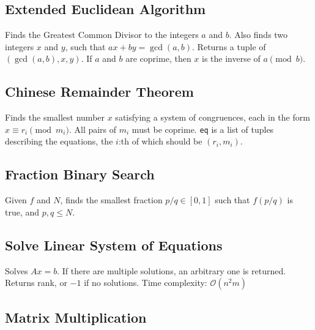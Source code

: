 \documentclass{article}
\begin{document}
\subsection*{Extended Euclidean Algorithm}
Finds the Greatest Common Divisor to the integers $a$ and $b$. Also finds two integers $x$ and $y$, such that $ax+by=\gcd(a,b)$.
Returns a tuple of $(\gcd(a, b), x, y)$. If $a$ and $b$ are coprime, then $x$ is the inverse of $a \pmod{b}$.
\begin{multicols}{2}
  
  \columnbreak
  
\end{multicols}

\subsection*{Chinese Remainder Theorem}
Finds the smallest number $x$ satisfying a system of congruences, each in the form $x \equiv r_i \pmod{m_i}$.
All pairs of $m_i$ must be coprime. \lstinline{eq} is a list of tuples describing the equations, the $i$:th of which should be $(r_i, m_i)$.
\begin{multicols}{2}
  
  \columnbreak
  
\end{multicols}

\subsection*{Fraction Binary Search}
Given $f$ and $N$, finds the smallest fraction $p/q \in [0, 1]$ such that $f(p/q)$ is true, and $p, q \le N$.


\subsection*{Solve Linear System of Equations}
Solves $A x = b$. If there are multiple solutions, an arbitrary one is returned.
Returns rank, or $-1$ if no solutions. Time complexity: $\mathcal{O}(n^2 m)$


\subsection*{Matrix Multiplication}

\end{document}
